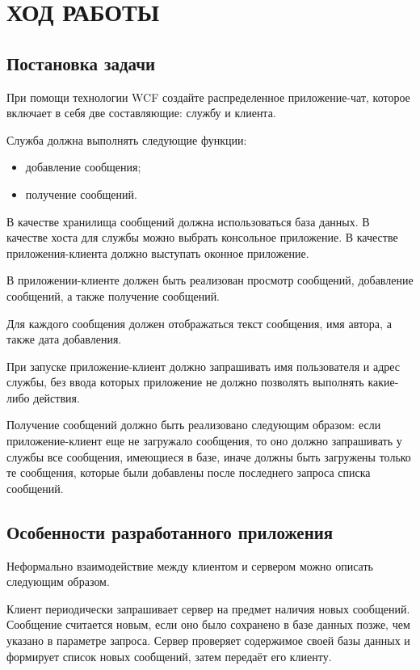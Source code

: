 \section{ХОД РАБОТЫ}

\subsection{Постановка задачи}

При помощи технологии WCF создайте распределенное приложение-чат,
которое включает в себя две составляющие: службу и клиента.

Служба должна выполнять следующие функции:
\begin{itemize}
\item добавление сообщения;
\item получение сообщений.
\end{itemize}

В качестве хранилища сообщений должна использоваться база данных.
В качестве хоста для службы можно выбрать консольное приложение.
В качестве приложения-клиента должно выступать оконное приложение.

В приложении-клиенте должен быть реализован просмотр сообщений,
добавление сообщений, а также получение сообщений.

Для каждого сообщения должен отображаться текст сообщения, имя
автора, а также дата добавления.

При запуске приложение-клиент должно запрашивать имя пользователя и
адрес службы, без ввода которых приложение не должно позволять выполнять
какие-либо действия.

Получение сообщений должно быть реализовано следующим образом:
если приложение-клиент еще не загружало сообщения, то оно должно
запрашивать у службы все сообщения, имеющиеся в базе, иначе должны быть
загружены только те сообщения, которые были добавлены после последнего
запроса списка сообщений.

\subsection{Особенности разработанного приложения}

Неформально взаимодействие между клиентом и сервером можно описать следующим образом.

Клиент периодически запрашивает сервер на предмет наличия новых сообщений.
Сообщение считается новым, если оно было сохранено в базе данных позже,
чем указано в параметре запроса.
Сервер проверяет содержимое своей базы данных и формирует список новых сообщений,
затем передаёт его клиенту.

